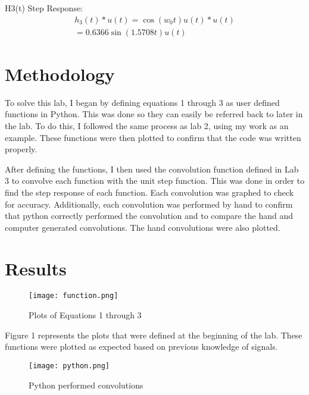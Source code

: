 \documentclass[12pt, titlepage]{article}
\begin{document}
        H3(t) Step Response:
        \begin{equation}
            \begin{split}
                h_3(t)*u(t) = \cos{(w_0t)}u(t)*u(t)\\
                =0.6366\sin{(1.5708t)}u(t)
            \end{split}
            \nonumber
        \end{equation}
        
        \section{Methodology}
        To solve this lab, I began by defining equations 1 through 3 as user defined functions
        in Python. This was done so they can easily be referred back to later in the lab. To do this,
        I followed the same process as lab 2, using my work as an example. These functions were
        then plotted to confirm that the code was written properly.
        
        After defining the functions, I then used the convolution function defined in Lab 3 to convolve each function with the unit step function.  This was done in order to find the step response of each function.  Each convolution was graphed to check for accuracy.  Additionally, each convolution was performed by hand to confirm that python correctly performed the convolution and to compare the hand and computer generated convolutions.  The hand convolutions were also plotted.
        
        \clearpage
        \section{Results}
        \begin{figure}[h!]
            \centering
            \texttt{[image: function.png]}
            \caption{Plots of Equations 1 through 3}
            \label{fig:my_label}
        \end{figure}
        
        Figure 1 represents the plots that were defined at the beginning of the lab. These functions were plotted as expected based on previous knowledge of signals.
        \clearpage
        \begin{figure}[h!]
            \centering
            \texttt{[image: python.png]}
            \caption{Python performed convolutions}
            \label{fig:my_label}
        \end{figure}
        
\end{document}
